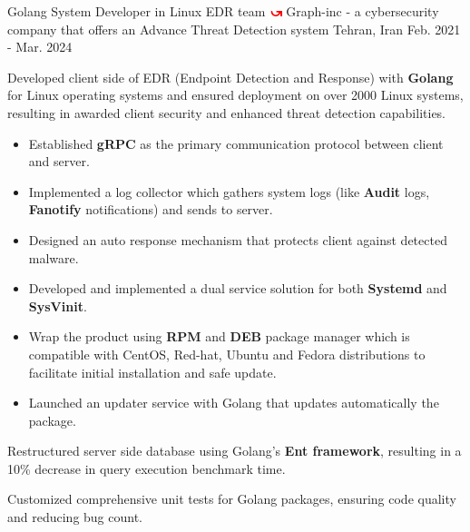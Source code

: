 \begin{cventries}
  \cventry
    {Golang System Developer in Linux EDR team} %
    {\includegraphics[width=0.027\textwidth]{images/graph-inc.png} Graph-inc - \textnormal{a cybersecurity company that offers an Advance Threat Detection system}} %
    {Tehran, Iran} %
    {Feb. 2021 - Mar. 2024} %
    {
      \begin{cvitems} %
        \item Developed client side of EDR (Endpoint Detection and Response) with \textbf{Golang} for Linux operating systems and ensured deployment on over 2000 Linux systems, resulting in awarded client security and enhanced threat detection capabilities.
        \begin{itemize}
            \item Established \textbf{gRPC} as the primary communication protocol between client and server.
            \item Implemented a log collector which gathers system logs (like \textbf{Audit} logs, \textbf{Fanotify} notifications) and sends to server. 
            \item Designed an auto response mechanism that protects client against detected malware.
            \item Developed and implemented a dual service solution for both \textbf{Systemd} and \textbf{SysVinit}.
            \item Wrap the product using \textbf{RPM} and \textbf{DEB} package manager which is compatible with CentOS, Red-hat, Ubuntu and Fedora distributions to facilitate initial installation and safe update.
            \item Launched an updater service with Golang that updates automatically the package.
        \end{itemize}
        \item Restructured server side database using Golang's \textbf{Ent framework}, resulting in a 10\% decrease in query execution benchmark time.
        \item Customized comprehensive unit tests for Golang packages, ensuring code quality and reducing bug count.
      \end{cvitems}
    }


\end{cventries}
